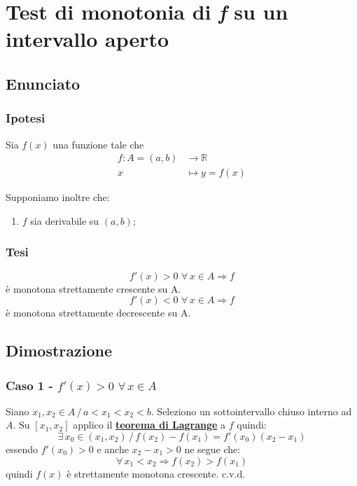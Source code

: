 \documentclass[../dimostrazioni]{subfiles}
\begin{document}
    \chapter{Test di monotonia di \textit{f} su un intervallo aperto}

        \section*{Enunciato}

        \subsection*{Ipotesi}

            Sia \(f(x)\) una funzione tale che
            \begin{align*}
                f : A = (a, b) &\longrightarrow \mathbb{R}\\
                x &\longmapsto y = f(x) 
            \end{align*}

            Supponiamo inoltre che:

            \begin{enumerate}
                \indentitem \item \(f\) sia derivabile su \((a, b)\);
            \end{enumerate}

        \subsection*{Tesi}

            \[ f'(x) > 0 \, \, \forall \, x \in A \Rightarrow f \] è monotona strettamente crescente su A. 
            \[ f'(x) < 0 \, \, \forall \, x \in A \Rightarrow f \] è monotona strettamente decrescente su A.

        \section*{Dimostrazione}

            \medskip

            \subsection*{Caso 1 - \( f'(x) > 0 \, \, \forall \, x \in A \)}

            Siano \(x_1, x_2 \in A \, / \, a < x_1 < x_2 < b \). Seleziono un sottointervallo chiuso interno ad \(A\).
            Su \( [x_1, x_2] \) applico il \textbf{\hyperref[teoLagrange]{teorema di Lagrange}} a \(f\) quindi:
            \[
                \exists \, x_0 \in (x_1, x_2) \, / \, f(x_2) - f(x_1) = f'(x_0)(x_2 - x_1) 
            \]
            essendo \( f'(x_0) > 0 \) e anche \( x_2 - x_1 > 0 \) ne segue che:
            \[
                \forall \, x_1 < x_2 \Rightarrow f(x_2) > f(x_1)
            \]
            quindi \(f(x)\) è strettamente monotona crescente. c.v.d.
\end{document}
